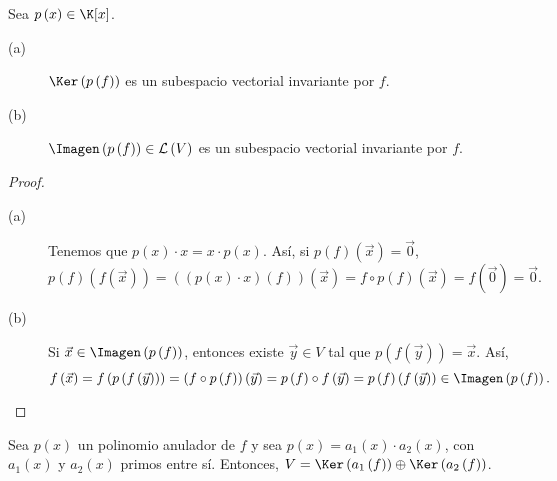 \begin{fprop}[]
\normalfont 
Sea $\displaystyle p\left(x\right) \in \K[x] $.
\begin{description}
\item[(a)] $\displaystyle \Ker\left(p\left(f\right)\right) $ es un subespacio vectorial invariante por $\displaystyle f $.
\item[(b)] $\displaystyle \Imagen\left(p\left(f\right)\right)\in \mathcal{L}\left(V\right) $ es un subespacio vectorial invariante por $\displaystyle f $.
\end{description}
\end{fprop}
\begin{proof}
\begin{description}
\item[(a)] Tenemos que $\displaystyle p\left(x\right) \cdot x = x \cdot p\left(x\right) $. Así, si $\displaystyle p\left(f\right) \left(\vec{x}\right) = \vec{0} $, 
	\[p\left(f\right)\left(f\left(\vec{x}\right)\right) = \left(\left(p\left(x\right) \cdot x\right)\left(f\right)\right)\left(\vec{x}\right) = f \circ p\left(f\right)\left(\vec{x}\right) = f\left(\vec{0}\right) = \vec{0} .\]
\item[(b)] Si $\displaystyle \vec{x} \in \Imagen\left(p\left(f\right)\right) $, entonces existe $\displaystyle \vec{y} \in V $ tal que $\displaystyle p\left(f\left(\vec{y}\right)\right) = \vec{x} $. Así,
	\[f\left(\vec{x}\right) = f\left(p\left(f\left(\vec{y}\right)\right)\right) = \left(f\circ p\left(f\right)\right)\left(\vec{y}\right) = p\left(f\right) \circ f\left(\vec{y}\right) = p\left(f\right)\left( f\left(\vec{y}\right) \right) \in \Imagen\left(p\left(f\right)\right).\]	
\end{description}
\end{proof}
\begin{ftheorem}[]
\normalfont Sea $\displaystyle p\left(x\right) $ un polinomio anulador de $\displaystyle f $ y sea $\displaystyle p\left(x\right) = a_{1}\left(x\right) \cdot a_{2}\left(x\right) $, con $\displaystyle a_{1}\left(x\right) $ y $\displaystyle a_{2}\left(x\right) $ primos entre sí. Entonces, $\displaystyle V = \Ker\left(a_{1}\left(f\right)\right) \oplus \Ker\left(a_{2}\left(f\right)\right) $.
\end{ftheorem}
